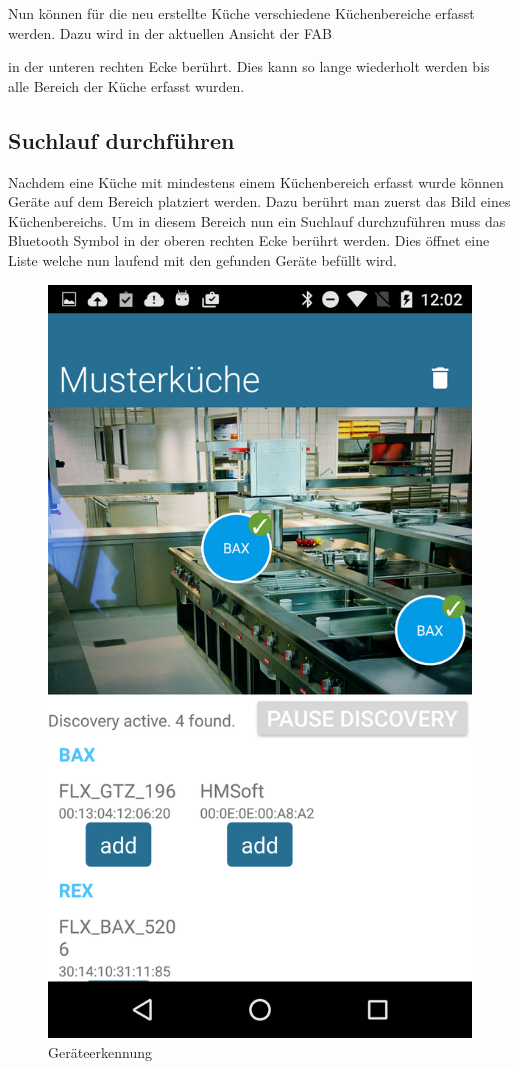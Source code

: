 Nun können für die neu erstellte Küche verschiedene Küchenbereiche erfasst werden. Dazu wird in der aktuellen Ansicht der \acl{FAB}

\WFclear
in der unteren rechten Ecke berührt. Dies kann so lange wiederholt werden bis alle Bereich der Küche erfasst wurden. 

\subsection{Suchlauf durchführen}

Nachdem eine Küche mit mindestens einem Küchenbereich erfasst wurde können Geräte auf dem Bereich platziert werden. Dazu berührt man zuerst das Bild eines Küchenbereichs. Um in diesem Bereich nun ein Suchlauf durchzuführen muss das Bluetooth Symbol in der oberen rechten Ecke berührt werden. Dies öffnet eine Liste welche nun laufend mit den gefunden Geräte befüllt wird. 

\begin{figure}
	\includegraphics[scale=0.13]{results/res/device_discovery}
	\caption{Geräteerkennung}
\end{figure}

